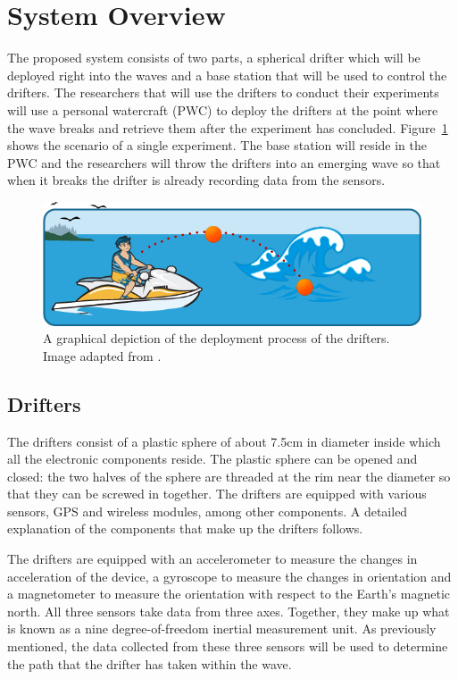 \section{System Overview}
The proposed system consists of two parts, a spherical drifter which will be deployed right into the waves and a base station that will be used to control the drifters.  The researchers that will use the drifters to conduct their experiments will use a personal watercraft (PWC) to deploy the drifters at the point where the wave breaks and retrieve them after the experiment has concluded. Figure~\ref{fig:systemOverview} shows the scenario of a single experiment.  The base station will reside in the PWC and the researchers will throw the drifters into an emerging wave so that when it breaks the drifter is already recording data from the sensors.    

\begin{figure}[H]
	\centering
	\includegraphics[width=\textwidth]{img/systemOverview}
	\caption{A graphical depiction of the deployment process of the drifters. Image adapted from \cite{boaterExam}. \label{fig:systemOverview}}
\end{figure}

\subsection{Drifters}
The drifters consist of a plastic sphere of about 7.5cm in diameter inside which all the electronic components reside.  The plastic sphere can be opened and closed: the two halves of the sphere are threaded at the rim near the diameter so that they can be screwed in together. The drifters are equipped with various sensors, GPS and wireless modules, among other components.  A detailed explanation of the components that make up the drifters follows.


The drifters are equipped with an accelerometer to measure the changes in acceleration of the device, a gyroscope to measure the changes in orientation and a magnetometer to measure the orientation with respect to the Earth's magnetic north.  All three sensors take data from three axes.  Together, they make up what is known as a nine degree-of-freedom inertial measurement unit.  As previously mentioned, the data collected from these three sensors will be used to determine the path that the drifter has taken within the wave.

